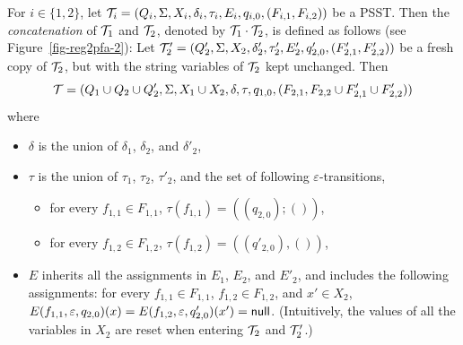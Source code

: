 \begin{definition}\label{def-psstconcat}
For $i \in \{1,2\}$, let $\mathcal{T}_i = (Q_i, \Sigma, X_i, \delta_i, \tau_i, E_i, q_{i,0}, (F_{i,1}, F_{i,2}))$ be a PSST. Then the \emph{concatenation} of $\mathcal{T}_1$ and $\mathcal{T}_2$, denoted by $\mathcal{T}_1 \cdot \mathcal{T}_2$, is defined as follows (see Figure~\ref{fig-reg2pfa-2}): 
Let  
$\mathcal{T}'_{2} = (Q'_{2}, \Sigma, X_{2}, \delta'_{2}, \tau'_{2}, E_{2}', q'_{2,0}, (F'_{2, 1}, F'_{2,2}))$ be a fresh copy of $\mathcal{T}_{2}$, but with the string variables of $\mathcal{T}_{2}$ kept unchanged. 
Then 
%
\[\mathcal{T} = ( Q_{1} \cup Q_{2} \cup Q'_{2}, \Sigma, X_1 \cup X_2, \delta, \tau, q_{1,0}, (F_{2,1}, F_{2,2} \cup F'_{2,1} \cup F'_{2,2}))\] 
where 
	\begin{itemize}
	\item $\delta$ is the union of $\delta_1$, $\delta_2$, and $\delta'_2$,
%
	\item $\tau$ is the union of $\tau_1$, $\tau_2$, $\tau'_2$, and the set of following $\varepsilon$-transitions,
	\begin{itemize}
%
	\item for every $f_{1,1} \in F_{1,1}$, $\tau(f_{1,1}) = ((q_{2,0}); ())$, 
%
	\item for every $f_{1,2} \in F_{1,2}$, $\tau(f_{1,2}) = ((q'_{2,0}), ())$,
	\end{itemize}
	\item $E$ inherits all the assignments in $E_1$, $E_2$, and $E'_2$, and includes the following assignments:  for every $f_{1,1} \in F_{1,1}$, $f_{1,2} \in F_{1,2}$, and $x' \in X_2$, $E(f_{1,1}, \varepsilon, q_{2,0})(x) = E(f_{1,2}, \varepsilon, q'_{2,0})(x')= \mathsf{null}$. (Intuitively, the values of all the variables in $X_2$ are reset when entering $\mathcal{T}_2$ and $\mathcal{T}'_2$.)
  \end{itemize}
		\begin{figure}[ht]

\end{figure}
\end{definition}
